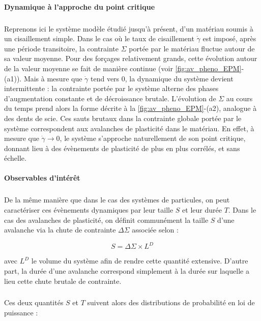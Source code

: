 \paragraph{Dynamique à l'approche du point critique}

\subparagraph{}Reprenons ici le système modèle étudié jusqu'à présent, d'un matériau soumis à un cisaillement simple. Dans le cas où le taux de cisaillement $\dot{\gamma}$ est imposé, après une période transitoire, la contrainte $\Sigma$ portée par le matériau fluctue autour de sa valeur moyenne. Pour des forçages relativement grands, cette évolution autour de la valeur moyenne se fait de manière continue (voir \autoref{fig:av_pheno_EPM}-(a1)). Mais à mesure que $\dot{\gamma}$ tend vers 0, la dynamique du système devient intermittente \cite{nicolas_deformation_2018} : la contrainte portée par le système alterne des phases d'augmentation constante et de décroissance brutale. L'évolution de $\Sigma$ au cours du temps prend alors la forme décrite à la \autoref{fig:av_pheno_EPM}-(a2), analogue à des dents de scie. Ces sauts brutaux dans la contrainte globale portée par le système correspondent aux avalanches de plasticité dans le matériau. En effet, à mesure que $\dot{\gamma}\rightarrow 0$, le système s'approche naturellement de son point critique, donnant lieu à des évènements de plasticité de plus en plus corrélés, et sans échelle.

\paragraph{Observables d'intérêt}

\subparagraph{}De la même manière que dans le cas des systèmes de particules, on peut caractériser ces évènements dynamiques par leur taille $S$ et leur durée $T$. Dans le cas des avalanches de plasticité, on définit communément la taille $S$ d'une avalanche via la chute de contrainte $\Delta\Sigma$ associée selon :

\begin{equation}
	S = \Delta\Sigma\times L^D
\end{equation}

\noindent avec $L^D$ le volume du système afin de rendre cette quantité extensive. D'autre part, la durée d'une avalanche correspond simplement à la durée sur laquelle a lieu cette chute brutale de contrainte.

\subparagraph{}Ces deux quantités $S$ et $T$ suivent alors des distributions de probabilité en loi de puissance :

